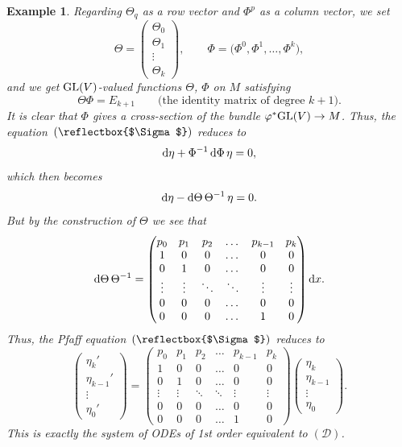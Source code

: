 \documentclass[pdftex]{sigma}%
\newcommand{\cD}{\mathcal D}
\DeclareRobustCommand{\amgiS}{\text{\reflectbox{$\Sigma$}}}
\newtheorem{ex}[thm]{Example}
\numberwithin{equation}{section}
\begin{document}
\begin{ex}
Regarding $\Theta_q$ as a row vector and $\Phi^p$ as a column vector, we set
\[
\Theta = \begin{pmatrix} \Theta_0 \\ \Theta_1 \\ \vdots \\ \Theta_k \end{pmatrix}\!,\qquad
\Phi = \big(\Phi^0,\Phi^1,\dots,\Phi^k\big),
\]
and we get ${\rm GL}(V)$-valued functions $\Theta$, $\Phi$ on $M$ satisfying
\[
\Theta\Phi = E_{k+1} \qquad\text{(the identity matrix of degree $k+1$)}.
\]
It is clear that $\Phi$ gives a cross-section of the bundle $\varphi^*{\rm GL}(V)\to M$. Thus, the equation~$(\amgiS)$ reduces to
\[
{\rm d}\eta + \Phi^{-1}\,{\rm d}\Phi\,\eta = 0,
\]
which then becomes
\[
{\rm d}\eta - {\rm d}\Theta\,\Theta^{-1}\,\eta = 0.
\]
But by the construction of $\Theta$ we see that
\[
{\rm d}\Theta\,\Theta^{-1} =
\begin{pmatrix} p_0 & p_1 & p_2 & \dots & p_{k-1} & p_k \\
1 & 0 & 0 & \dots & 0 & 0\\
0 & 1 & 0 & \dots & 0 & 0\\
\vdots & \vdots & \ddots & \ddots & \vdots & \vdots \\
0 & 0 & 0 & \dots & 0 & 0 \\
0 & 0 & 0 & \dots & 1 & 0
\end{pmatrix}{\rm d}x.
\]
Thus, the Pfaff equation~$(\amgiS)$ reduces to
\[
\begin{pmatrix}
\eta_k' \\
\eta_{k-1}'\\
\vdots \\
\eta_0'
\end{pmatrix} =
\begin{pmatrix} p_0 & p_1 & p_2 & \dots & p_{k-1} & p_k \\
1 & 0 & 0 & \dots & 0 & 0\\
0 & 1 & 0 & \dots & 0 & 0\\
\vdots & \vdots & \ddots & \ddots & \vdots & \vdots \\
0 & 0 & 0 & \dots & 0 & 0 \\
0 & 0 & 0 & \dots & 1 & 0
\end{pmatrix}
\begin{pmatrix}
\eta_k \\
\eta_{k-1}\\
\vdots \\
\eta_0
\end{pmatrix}\!.
\]
This is exactly the system of ODEs of 1st order equivalent to $(\cD)$.


\end{ex}
\end{document}
